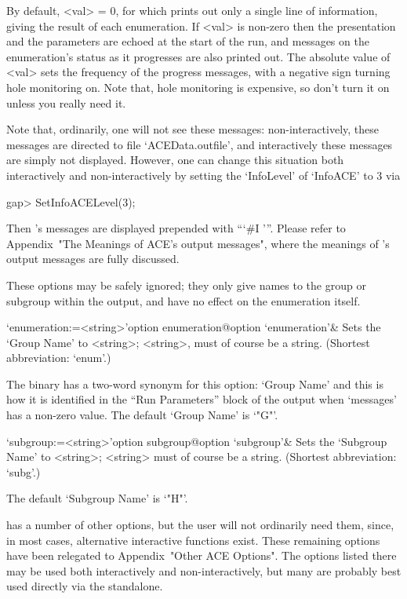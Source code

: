 By default, <val> = 0, for which {\ACE} prints out only a single  line
of information, giving the result of each  enumeration.  If  <val>  is
non-zero then the presentation and the parameters are  echoed  at  the
start of the run, and messages  on  the  enumeration's  status  as  it
progresses are also printed out. The absolute value of <val> sets  the
frequency of the progress messages, with a negative sign turning  hole
monitoring on. Note that, hole monitoring is expensive, so don't  turn
it on unless you really need it.

Note   that,  ordinarily,  one   will   not   see   these    messages:
non-interactively,   these   messages    are    directed    to    file
`ACEData.outfile', and interactively  these
messages are simply  not  displayed.  However,  one  can  change  this
situation both interactively and   non-interactively  by  setting  the
`InfoLevel' of `InfoACE' to 3 via

\beginexample
gap> SetInfoACELevel(3);

\endexample

Then {\ACE}'s messages are  displayed  prepended  with  ```\#I  '''.
Please refer to Appendix~"The  Meanings  of  ACE's  output  messages",
where the meanings of {\ACE}'s output messages are fully discussed.

\enditems


These options may be safely ignored; they only give names to the group
or subgroup within the {\ACE}  output,  and  have  no  effect  on  the
enumeration itself.

\beginitems

\>`enumeration:=<string>'{option enumeration}@{option `enumeration'}&
Sets the `Group Name' to <string>;  <string>,  must  of  course  be  a
string. (Shortest abbreviation: `enum'.)

The {\ACE} binary has a two-word synonym for this option: `Group Name'
and this is how it is identified in the ``Run  Parameters''  block  of
the {\ACE} output when `messages' has a non-zero  value.  The  default
`Group Name' is `"G"'.

\>`subgroup:=<string>'{option subgroup}@{option `subgroup'}& 
Sets the `Subgroup Name' to <string>; <string> must  of  course  be  a
string. (Shortest abbreviation: `subg'.)

The default `Subgroup Name' is `"H"'.

\enditems


{\ACE} has a number of other options, but the  {\GAP}  user  will  not
ordinarily need them, since, in most  cases,  alternative  interactive
functions exist.  These  remaining  options  have  been  relegated  to
Appendix~"Other ACE Options". The options listed  there  may  be  used
both interactively and non-interactively, but many are  probably  best
used directly via the {\ACE} standalone.


